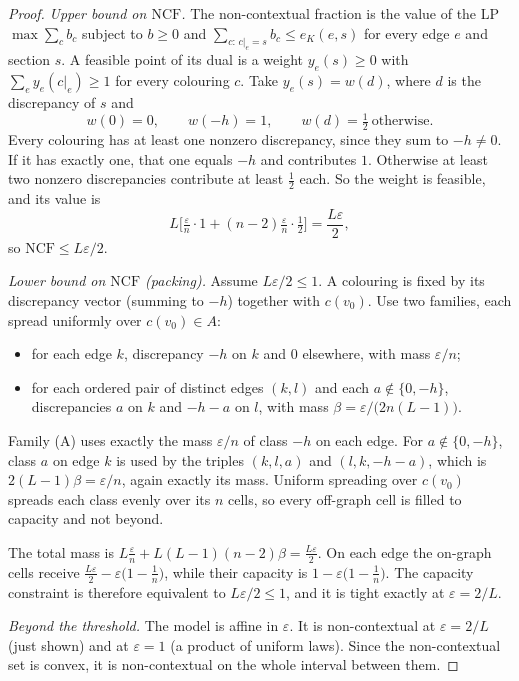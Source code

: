 \documentclass[11pt]{article}
\theoremstyle{definition}
\theoremstyle{remark}
\newcommand{\NCF}{\mathrm{NCF}}
\begin{document}
\begin{proof}
\emph{Upper bound on $\NCF$.} The non-contextual fraction is the value of the LP $\max\sum_c b_c$ subject to $b\ge0$ and $\sum_{c:\,c|_e=s}b_c\le e_K(e,s)$ for every edge $e$ and section $s$. A feasible point of its dual is a weight $y_e(s)\ge0$ with $\sum_e y_e(c|_e)\ge1$ for every colouring $c$. Take $y_e(s)=w(d)$, where $d$ is the discrepancy of $s$ and
\[
w(0)=0,\qquad w(-h)=1,\qquad w(d)=\tfrac12\ \text{otherwise}.
\]
Every colouring has at least one nonzero discrepancy, since they sum to $-h\neq0$. If it has exactly one, that one equals $-h$ and contributes $1$. Otherwise at least two nonzero discrepancies contribute at least $\tfrac12$ each. So the weight is feasible, and its value is
\[
L\Big[\tfrac{\varepsilon}{n}\cdot1+(n-2)\tfrac{\varepsilon}{n}\cdot\tfrac12\Big]=\frac{L\varepsilon}{2},
\]
so $\NCF\le L\varepsilon/2$.

\emph{Lower bound on $\NCF$ (packing).} Assume $L\varepsilon/2\le1$. A colouring is fixed by its discrepancy vector (summing to $-h$) together with $c(v_0)$. Use two families, each spread uniformly over $c(v_0)\in A$:
\begin{itemize}
  \item[(A)] for each edge $k$, discrepancy $-h$ on $k$ and $0$ elsewhere, with mass $\varepsilon/n$;
  \item[(B)] for each ordered pair of distinct edges $(k,l)$ and each $a\notin\{0,-h\}$, discrepancies $a$ on $k$ and $-h-a$ on $l$, with mass $\beta=\varepsilon/\big(2n(L-1)\big)$.
\end{itemize}
Family (A) uses exactly the mass $\varepsilon/n$ of class $-h$ on each edge. For $a\notin\{0,-h\}$, class $a$ on edge $k$ is used by the triples $(k,l,a)$ and $(l,k,-h-a)$, which is $2(L-1)\beta=\varepsilon/n$, again exactly its mass. Uniform spreading over $c(v_0)$ spreads each class evenly over its $n$ cells, so every off-graph cell is filled to capacity and not beyond.

The total mass is $L\tfrac{\varepsilon}{n}+L(L-1)(n-2)\beta=\tfrac{L\varepsilon}{2}$. On each edge the on-graph cells receive $\tfrac{L\varepsilon}{2}-\varepsilon\big(1-\tfrac1n\big)$, while their capacity is $1-\varepsilon\big(1-\tfrac1n\big)$. The capacity constraint is therefore equivalent to $L\varepsilon/2\le1$, and it is tight exactly at $\varepsilon=2/L$.

\emph{Beyond the threshold.} The model is affine in $\varepsilon$. It is non-contextual at $\varepsilon=2/L$ (just shown) and at $\varepsilon=1$ (a product of uniform laws). Since the non-contextual set is convex, it is non-contextual on the whole interval between them.
\end{proof}
\end{document}
